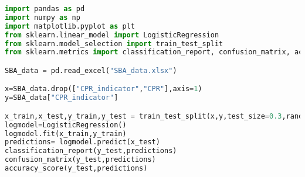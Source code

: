 \begin{lstlisting}[language=Python, caption=Python example] 
import pandas as pd
import numpy as np
import matplotlib.pyplot as plt
from sklearn.linear_model import LogisticRegression
from sklearn.model_selection import train_test_split
from sklearn.metrics import classification_report, confusion_matrix, accuracy_score

SBA_data = pd.read_excel("SBA_data.xlsx")

x=SBA_data.drop(["CPR_indicator","CPR"],axis=1)
y=SBA_data["CPR_indicator"]

x_train,x_test,y_train,y_test = train_test_split(x,y,test_size=0.3,random_state=1)
logmodel=LogisticRegression()
logmodel.fit(x_train,y_train)
predictions= logmodel.predict(x_test)
classification_report(y_test,predictions)
confusion_matrix(y_test,predictions)
accuracy_score(y_test,predictions)

\end{lstlisting}

